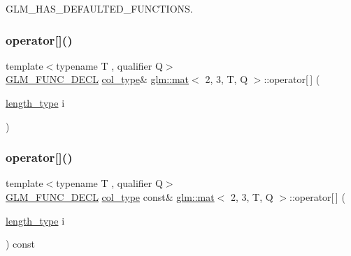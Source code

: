 G\+L\+M\+\_\+\+H\+A\+S\+\_\+\+D\+E\+F\+A\+U\+L\+T\+E\+D\+\_\+\+F\+U\+N\+C\+T\+I\+O\+NS. 

\mbox{\label{structglm_1_1mat_3_012_00_013_00_01_t_00_01_q_01_4_a946520cc2889c97e6841cbf5c36ee715}} 
\subsubsection{\texorpdfstring{operator[]()}{operator[]()}\hspace{0.1cm}{\footnotesize\ttfamily [1/2]}}
{\footnotesize\ttfamily template$<$typename T , qualifier Q$>$ \\
\mbox{\hyperlink{setup_8hpp_ab2d052de21a70539923e9bcbf6e83a51}{G\+L\+M\+\_\+\+F\+U\+N\+C\+\_\+\+D\+E\+CL}} \mbox{\hyperlink{structglm_1_1mat_3_012_00_013_00_01_t_00_01_q_01_4_aebe4faf14ea1bc3092b4bbf591d7194e}{col\+\_\+type}}\& \mbox{\hyperlink{structglm_1_1mat}{glm\+::mat}}$<$ 2, 3, T, Q $>$\+::operator\mbox{[}$\,$\mbox{]} (\begin{DoxyParamCaption}\item[{\mbox{\hyperlink{structglm_1_1mat_3_012_00_013_00_01_t_00_01_q_01_4_ad2e2433ba375abcd6bada873f8ea2de1}{length\+\_\+type}}}]{i }\end{DoxyParamCaption})}

\mbox{\label{structglm_1_1mat_3_012_00_013_00_01_t_00_01_q_01_4_abef4a7f73eb38bb050aad6894e1189d8}} 
\subsubsection{\texorpdfstring{operator[]()}{operator[]()}\hspace{0.1cm}{\footnotesize\ttfamily [2/2]}}
{\footnotesize\ttfamily template$<$typename T , qualifier Q$>$ \\
\mbox{\hyperlink{setup_8hpp_ab2d052de21a70539923e9bcbf6e83a51}{G\+L\+M\+\_\+\+F\+U\+N\+C\+\_\+\+D\+E\+CL}} \mbox{\hyperlink{structglm_1_1mat_3_012_00_013_00_01_t_00_01_q_01_4_aebe4faf14ea1bc3092b4bbf591d7194e}{col\+\_\+type}} const\& \mbox{\hyperlink{structglm_1_1mat}{glm\+::mat}}$<$ 2, 3, T, Q $>$\+::operator\mbox{[}$\,$\mbox{]} (\begin{DoxyParamCaption}\item[{\mbox{\hyperlink{structglm_1_1mat_3_012_00_013_00_01_t_00_01_q_01_4_ad2e2433ba375abcd6bada873f8ea2de1}{length\+\_\+type}}}]{i }\end{DoxyParamCaption}) const}



